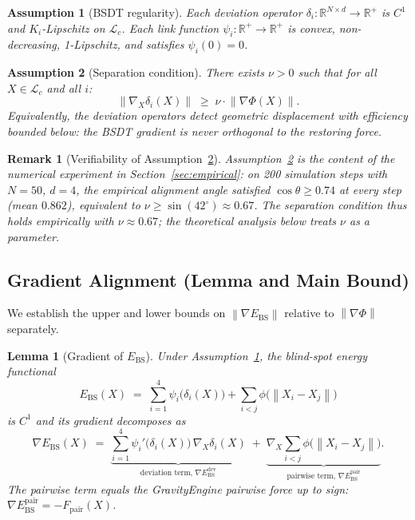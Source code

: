 \documentclass[11pt]{article}
\newtheorem{lemma}[theorem]{Lemma}
\newtheorem{remark}[theorem]{Remark}
\newtheorem{assumption}{Assumption}
\theoremstyle{definition}
\newcommand{\R}{\mathbb{R}}
\newcommand{\grad}{\nabla}
\newcommand{\Ebs}{E_{\mathrm{BS}}}
\newcommand{\norm}[1]{\left\|#1\right\|}
\newcommand{\costheta}{\cos\theta}
\begin{document}
\begin{assumption}[BSDT regularity]
\label{ass:bsdt}
Each deviation operator $\delta_i : \R^{N\times d}\to\R^+$ is $C^1$ and
$K_i$-Lipschitz on $\mathcal{L}_c$.  Each link function $\psi_i : \R^+\to\R^+$
is convex, non-decreasing, 1-Lipschitz, and satisfies $\psi_i(0)=0$.
\end{assumption}

\begin{assumption}[Separation condition]
\label{ass:sep}
There exists $\nu > 0$ such that for all $X\in\mathcal{L}_c$ and all $i$:
\[
  \norm{\grad_X \delta_i(X)} \;\ge\; \nu \cdot \norm{\grad\Phi(X)}.
\]
Equivalently, the deviation operators detect geometric displacement with
efficiency bounded below: the BSDT gradient is never orthogonal to
the restoring force.
\end{assumption}

\begin{remark}[Verifiability of Assumption~\ref{ass:sep}]
\label{rem:verifiable}
Assumption~\ref{ass:sep} is the content of the numerical experiment in
Section~\ref{sec:empirical}: on 200 simulation steps with $N=50$, $d=4$,
the empirical alignment angle satisfied $\costheta \ge 0.74$ at every step
(mean $0.862$), equivalent to $\nu \ge \sin(42^\circ) \approx 0.67$.  The
separation condition thus holds empirically with $\nu \approx 0.67$;
the theoretical analysis below treats $\nu$ as a parameter.
\end{remark}

\subsection{Gradient Alignment (Lemma and Main Bound)}
\label{sec:equiv:gradient}

We establish the upper and lower bounds on $\norm{\grad\Ebs}$ relative to
$\norm{\grad\Phi}$ separately.

\begin{lemma}[Gradient of $\Ebs$]
\label{lem:grad_ebs}
Under Assumption~\ref{ass:bsdt}, the blind-spot energy functional
\[
  \Ebs(X) \;=\; \sum_{i=1}^{4}\psi_i\bigl(\delta_i(X)\bigr)
              + \sum_{i < j}\phi\bigl(\norm{X_i - X_j}\bigr)
\]
is $C^1$ and its gradient decomposes as
\[
  \grad\Ebs(X)
  \;=\;
  \underbrace{\sum_{i=1}^{4}\psi_i'\bigl(\delta_i(X)\bigr)\,\grad_X\delta_i(X)}%
             _{\text{deviation term, }\grad\Ebs^{\mathrm{dev}}}
  \;+\;
  \underbrace{\grad_X\sum_{i<j}\phi\bigl(\norm{X_i-X_j}\bigr)}%
             _{\text{pairwise term, }\grad\Ebs^{\mathrm{pair}}}.
\]
The pairwise term equals the GravityEngine pairwise force up to sign:
$\grad\Ebs^{\mathrm{pair}} = -F_{\mathrm{pair}}(X)$.
\end{lemma}
\end{document}
